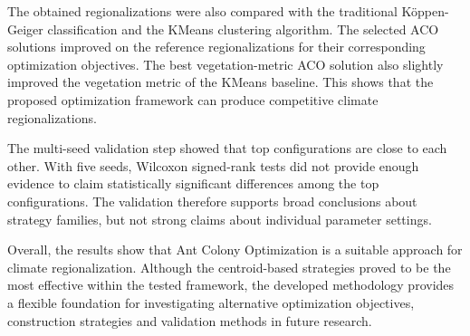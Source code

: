 \documentclass[11pt]{article}
\begin{document}
The obtained regionalizations were also compared with the traditional Köppen-Geiger classification and the KMeans clustering algorithm. The selected ACO solutions improved on the reference regionalizations for their corresponding optimization objectives. The best vegetation-metric ACO solution also slightly improved the vegetation metric of the KMeans baseline. This shows that the proposed optimization framework can produce competitive climate regionalizations.

The multi-seed validation step showed that top configurations are close to each other. With five seeds, Wilcoxon signed-rank tests did not provide enough evidence to claim statistically significant differences among the top configurations. The validation therefore supports broad conclusions about strategy families, but not strong claims about individual parameter settings.

Overall, the results show that Ant Colony Optimization is a suitable approach for climate regionalization. Although the centroid-based strategies proved to be the most effective within the tested framework, the developed methodology provides a flexible foundation for investigating alternative optimization objectives, construction strategies and validation methods in future research.
\end{document}
